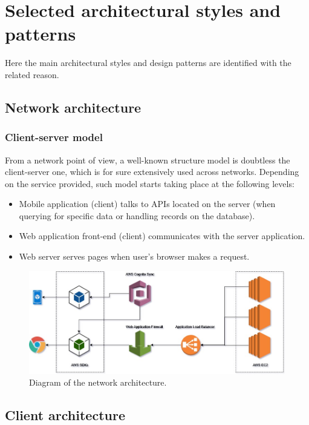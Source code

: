 \section{Selected architectural styles and patterns}
\label{sec:archs}

Here the main architectural styles and design patterns are identified with the related reason.

\subsection*{Network architecture}
\subsubsection*{Client-server model}
From a network point of view, a well-known structure model is doubtless the client-server one, which is for sure extensively used across networks. Depending on the service provided, such model starts taking place at the following levels:
\begin{itemize}
	\item Mobile application (client) talks to APIs located on the server (when querying for specific data or handling records on the database).
	\item Web application front-end (client) communicates with the server application.
	\item Web server serves pages when user's browser makes a request.
\end{itemize}

\begin{figure}[H]
	\centering
	\includegraphics[width=7in]{./diagrams/NetworkDiagram.jpg}
	\caption{Diagram of the network architecture.}
	\label{fig:seqNetworkDiagram}
\end{figure}

\subsection*{Client architecture}
